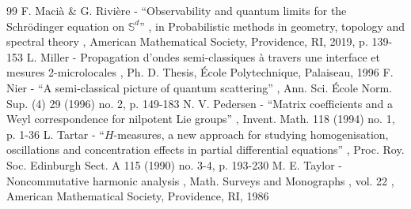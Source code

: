 \begin{thebibliography}{99}
 F. Macià \& G. Rivière - “Observability and quantum limits for the Schrödinger equation on $\mathbb{S}^d$” , in Probabilistic methods in geometry, topology and spectral theory , American Mathematical Society, Providence, RI, 2019, p. 139-153
 L. Miller - Propagation d’ondes semi-classiques à travers une interface et mesures 2-microlocales , Ph. D. Thesis, École Polytechnique, Palaiseau, 1996
 F. Nier - “A semi-classical picture of quantum scattering” , Ann. Sci. École Norm. Sup. (4) 29 (1996) no. 2, p. 149-183
 N. V. Pedersen - “Matrix coefficients and a Weyl correspondence for nilpotent Lie groups” , Invent. Math. 118 (1994) no. 1, p. 1-36
 L. Tartar - “$H$-measures, a new approach for studying homogenisation, oscillations and concentration effects in partial differential equations” , Proc. Roy. Soc. Edinburgh Sect. A 115 (1990) no. 3-4, p. 193-230
 M. E. Taylor - Noncommutative harmonic analysis , Math. Surveys and Monographs , vol. 22 , American Mathematical Society, Providence, RI, 1986
\end{thebibliography}
